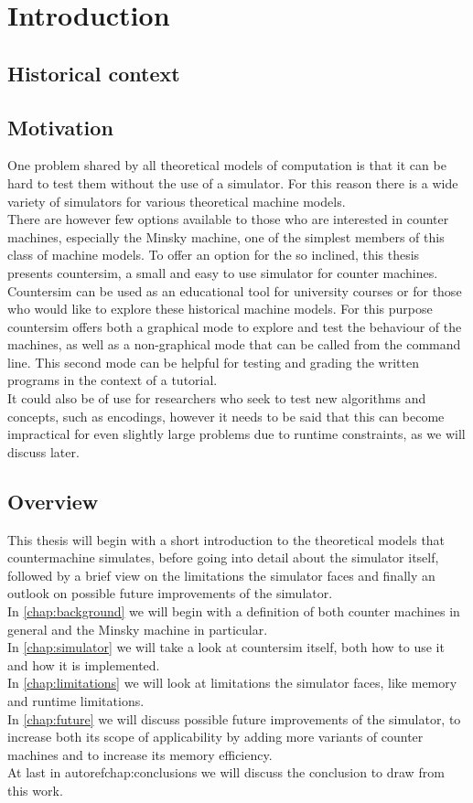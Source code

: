 \chapter{Introduction}
\section{Historical context}
\section{Motivation}
One problem shared by all theoretical models of computation is that it can be hard to test them without the use of a simulator.
For this reason there is a wide variety of simulators for various theoretical machine models\cite{Chakraborty:2011:FYA:2038876.2038893}.\\
There are however few options available to those who are interested in counter machines, especially the Minsky machine, one of the simplest members of this class of machine models. To offer an option for the so inclined, this thesis presents countersim, a small and easy to use simulator for counter machines.\\
Countersim can be used as an educational tool for university courses or for those who would like to explore these historical machine models. For this purpose countersim offers both a graphical mode to explore and test the behaviour of the machines, as well as a non-graphical mode that can be called from the command line. This second mode can be helpful for testing and grading the written programs in the context of a tutorial.\\
It could also be of use for researchers who seek to test new algorithms and concepts, such as encodings, however it needs to be said that this can become impractical for even slightly large problems due to runtime constraints, as we will discuss later.
\section{Overview}
This thesis will begin with a short introduction to the theoretical models that countermachine simulates, before going into detail about the simulator itself, followed by a brief view on the limitations the simulator faces and finally an outlook on possible future improvements of the simulator.\\
In \autoref{chap:background} we will begin with a definition of both counter machines in general and the Minsky machine in particular.\\
In \autoref{chap:simulator} we will take a look at countersim itself, both how to use it and how it is implemented.\\
In \autoref{chap:limitations} we will look at limitations the simulator faces, like memory and runtime limitations.\\
In \autoref{chap:future} we will discuss possible future improvements of the simulator, to increase both its scope of applicability by adding more variants of counter machines and to increase its memory efficiency.\\
At last in autoref{chap:conclusions} we will discuss the conclusion to draw from this work.
